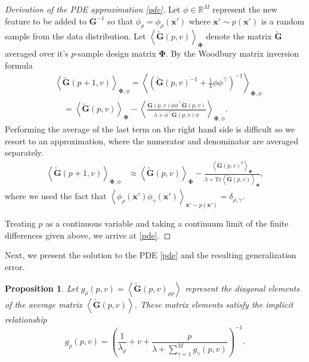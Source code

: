 \documentclass{article}
\newtheorem{proposition}{Proposition}
\begin{document}
\begin{proof}[Derivation of the PDE approximation \eqref{pde}] 
Let $\phi \in \mathbb{R}^M$ represent the new feature to be added to $\mathbf{G}^{-1}$ so that $\phi_\rho = \phi_\rho(\mathbf{x}')$ where $\mathbf{x}' \sim p(\mathbf{x}')$ is a random sample from the data distribution. Let $\left< \mathbf{\tilde{G}}(p,v)\right>_{\mathbf{\Phi}}$ denote the matrix $\mathbf{\tilde{G}}$ averaged over it's $p$-sample design matrix $\mathbf{\Phi}$. By the Woodbury matrix inversion formula 
\begin{align}
   & \left< \mathbf{\tilde{G}}(p+1,v) \right>_{\mathbf{\Phi}, \phi} = \left< \left( \mathbf{\tilde{G}}(p,v)^{-1} + \frac{1}{\lambda} \phi \phi^\top \right)^{-1} \right>_{\mathbf{\Phi}, \phi}
    \nonumber \\
    &\quad= \left< \mathbf{\tilde{G}}(p,v) \right>_{\mathbf{\Phi}} - \left< \frac{\mathbf{\tilde{G}}(p,v) \phi \phi^\top \mathbf{\tilde{G}}(p,v)}{\lambda + \phi^\top \mathbf{\tilde{G}}(p,v) \phi} \right>_{\mathbf{\Phi}, \phi}.
\end{align}
%
Performing the average of the last term on the right hand side is  difficult so we resort to an approximation, where the numerator and denominator are averaged separately. 
%
\begin{align}
    \left< \mathbf{\tilde{G}}(p+1,v) \right>_{\mathbf{\Phi}, \phi} &\approx %
   \left< \mathbf{\tilde{G}}(p,v) \right>_{\mathbf{\Phi}} - \frac{\left< \mathbf{\tilde{G}}(p,v)^2 \right>_{\mathbf{\Phi}}}{\lambda + \text{Tr} \left< \mathbf{\tilde{G}}(p,v)\right>_{\mathbf{\Phi}}},
\end{align}
%
where we used the fact that $\left< \phi_\rho(\mathbf{x'}) \phi_\gamma(\mathbf{x}')\right>_{\mathbf{x}' \sim p(\mathbf{x}')} = \delta_{\rho,\gamma}$.

Treating $p$ as a continuous variable and taking a continuum limit of the finite differences given above, we arrive at \eqref{pde}.
\end{proof}

Next, we present the solution to the PDE \eqref{pde} and the resulting generalization error.

\begin{proposition}\label{prop2}
Let $g_\rho(p,v)  = \left< \mathbf{\tilde{G}}(p,v)_{\rho \rho} \right>$ represent the diagonal elements of the average matrix $\left< \mathbf{\tilde{G}}(p,v) \right>$. These matrix elements satisfy the implicit relationship
\begin{equation}
    g_\rho(p,v)= \left(\frac{1}{\lambda_\rho} + v + \frac{p}{\lambda + \sum_{\gamma=1}^M g_\gamma(p,v)}\right)^{-1}.
\end{equation}
\end{proposition}
\end{document}
